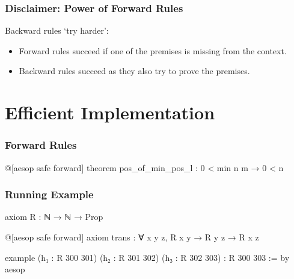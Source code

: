 \begin{frame}
  \frametitle{Disclaimer: Power of Forward Rules}
  Backward rules \enquote*{try harder}:
  \begin{itemize}
    \item<2-> Forward rules {} succeed if one of the premises is missing from the context.
    \item<3-> Backward rules {} succeed as they also try to prove the premises.
  \end{itemize}
\end{frame}




\section{Efficient Implementation}

\begin{frame}[fragile]
  \frametitle{Forward Rules}

  \begin{leancode}
    @[aesop safe forward]
    theorem pos_of_min_pos_l : 0 < min n m → 0 < n
  \end{leancode}

  \begin{tcolorbox}
    \begin{center}
    \end{center}
  \end{tcolorbox}
\end{frame}

\begin{frame}[fragile]
  \frametitle{Running Example}

  \begin{leancode}
    axiom R : ℕ → ℕ → Prop

    @[aesop safe forward]
    axiom trans : ∀ x y z, R x y → R y z → R x z

    example
        (h₁ : R 300 301)
        (h₂ : R 301 302)
        (h₃ : R 302 303) :
        R 300 303 := by
      aesop
  \end{leancode}
\end{frame}

